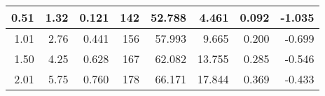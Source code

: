 \begin{table}[h]
\begin{tabular}{|r|r|r|r|r|r|r|r|}
		0.51                                                                                                  & 1.32                                                                                                         & 0.121                                             & 142                                                                                                    & 52.788                                                                                          & 4.461                                                & 0.092                                                    & -1.035                                                \\ \hline
		1.01                                                                                                  & 2.76                                                                                                         & 0.441                                             & 156                                                                                                    & 57.993                                                                                          & 9.665                                                & 0.200                                                    & -0.699                                                \\ \hline
		1.50                                                                                                  & 4.25                                                                                                         & 0.628                                             & 167                                                                                                    & 62.082                                                                                          & 13.755                                               & 0.285                                                    & -0.546                                                \\ \hline
		2.01                                                                                                  & 5.75                                                                                                         & 0.760                                             & 178                                                                                                    & 66.171                                                                                          & 17.844                                               & 0.369                                                    & -0.433                                                \\ \hline

\end{tabular}
\end{table}

